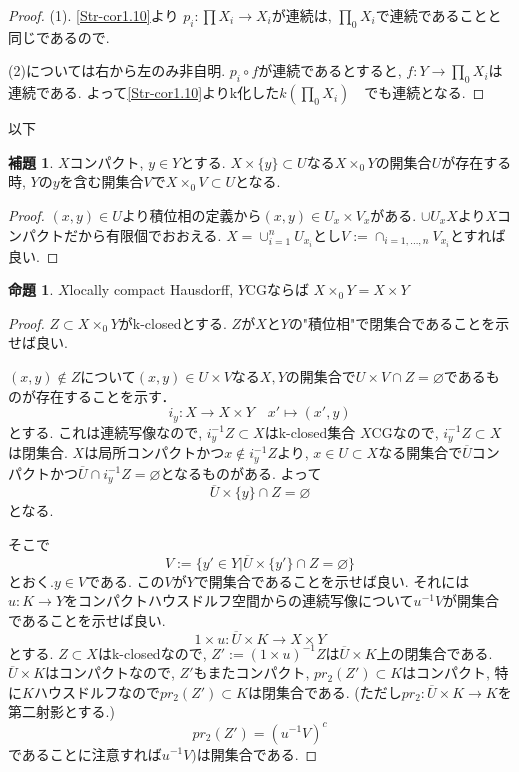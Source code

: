 \documentclass[dvipdfmx,a4paper,11pt]{article}
\theoremstyle{definition}
\newtheorem{lem}[thm]{補題}
\newtheorem{prop}[thm]{命題}
\begin{document}
\begin{proof}
(1). \ref{Str-cor1.10}より
$p_i : \prod X_i \to X_i$が連続は, $\prod_0 X_i$で連続であることと同じであるので.

(2)については右から左のみ非自明. 
$p_i \circ f $が連続であるとすると, $f : Y \to \prod_0 X_i $は連続である.
よって\ref{Str-cor1.10}よりk化した$k(\prod_0 X_i)$　でも連続となる. 
\end{proof}

以下
 \begin{tcolorbox}
 [colback = white, colframe = green!35!black, fonttitle = \bfseries,breakable = true]
\begin{lem}\cite[Lem 2.5]{Str}
\label{Str-lem2.5}
$X$コンパクト, $y \in Y$とする.
$X \times \{ y\} \subset U$なる$X \times_0 Y$の開集合$U$が存在する時,
$Y$の$y$を含む開集合$V$で$X \times_{0} V \subset U$となる.
\end{lem}
\end{tcolorbox}

\begin{proof}
$(x,y ) \in U$より積位相の定義から$(x,y) \in U_x \times V_x$がある.
$\cup U_x X$より$X$コンパクトだから有限個でおおえる.
$X = \cup_{i=1}^{n} U_{x_i}$とし$V:= \cap_{i=1,\ldots, n} V_{x_i}$とすれば良い. 
\end{proof}

 \begin{tcolorbox}
 [colback = white, colframe = green!35!black, fonttitle = \bfseries,breakable = true]
\begin{prop}\cite[Prop2.6]{Str}
$X$locally compact Hausdorff, $Y$CGならば
$X \times_0 Y = X \times Y$
\end{prop}
\end{tcolorbox}
\begin{proof}
$Z \subset X \times_0 Y$がk-closedとする. 
$Z$が$X$と$Y$の"積位相"で閉集合であることを示せば良い.

$(x,y) \not \in Z$について$(x,y) \in U \times V$なる$X,Y$の開集合で$U\times V \cap Z =\varnothing$であるものが存在することを示す．
$$
i_y : X \to X \times Y \quad x' \mapsto (x',y)
$$
とする. これは連続写像なので, $i_{y}^{-1}Z \subset X$はk-closed集合
$X$CGなので, $i_{y}^{-1}Z \subset X$は閉集合.
$X$は局所コンパクトかつ$x \not \in i_{y}^{-1}Z $より, $x \in U \subset X$なる開集合で$\overline{U}$コンパクトかつ$\overline{U} \cap i_{y}^{-1}Z = \varnothing$となるものがある.
よって
$$\overline{U} \times \{ y\} \cap Z = \varnothing
$$
となる. 

そこで
$$
V:= \{ y' \in Y | \overline{U} \times \{ y' \} \cap Z = \varnothing\}
$$
とおく.$y \in V$である. この$V$が$Y$で開集合であることを示せば良い.
それには$u : K \to Y$をコンパクトハウスドルフ空間からの連続写像について$u^{-1}V$が開集合であることを示せば良い.
$$
1 \times u : \overline{U} \times K \to X \times Y
$$
とする. 
$Z \subset X$はk-closedなので, 
$Z' := (1 \times u)^{-1}Z$は$\overline{U} \times K$上の閉集合である. 
$\overline{U} \times K$はコンパクトなので, $Z'$もまたコンパクト, 
$pr_2(Z') \subset K$はコンパクト, 特に$K$ハウスドルフなので$pr_2(Z') \subset K$は閉集合である.
(ただし$pr_2 : \overline{U} \times K \to K$を第二射影とする.)
$$
pr_2(Z') = (u^{-1}V)^c
$$
であることに注意すれば$u^{-1}V)$は開集合である. 
\end{proof}
\end{document}
